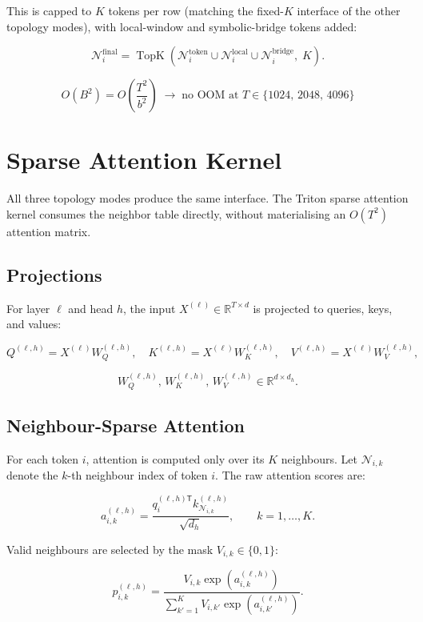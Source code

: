 \documentclass[11pt]{article}
\newcommand{\R}{\mathbb{R}}
\newcommand{\TopK}{\operatorname{TopK}}
\begin{document}
This is capped to $K$ tokens per row (matching the fixed-$K$ interface
of the other topology modes), with local-window and symbolic-bridge
tokens added:

\[
\mathcal{N}_i^{\text{final}}
= \TopK\!\left(
    \mathcal{N}_i^{\text{token}}
    \cup \mathcal{N}_i^{\text{local}}
    \cup \mathcal{N}_i^{\text{bridge}},\;
    K
  \right).
\]

\[
\boxed{
  O(B^2) = O\!\left(\frac{T^2}{b^2}\right)
  \;\longrightarrow\;
  \text{no OOM at }T \in \{1024,\,2048,\,4096\}
}
\]

\section*{Sparse Attention Kernel}

All three topology modes produce the same interface.
The Triton sparse attention kernel consumes the neighbor table directly,
without materialising an $O(T^2)$ attention matrix.

\subsection*{Projections}

For layer $\ell$ and head $h$, the input $X^{(\ell)} \in \R^{T \times d}$
is projected to queries, keys, and values:

\[
Q^{(\ell,h)} = X^{(\ell)} W_Q^{(\ell,h)},
\quad
K^{(\ell,h)} = X^{(\ell)} W_K^{(\ell,h)},
\quad
V^{(\ell,h)} = X^{(\ell)} W_V^{(\ell,h)},
\]

\[
W_Q^{(\ell,h)},\, W_K^{(\ell,h)},\, W_V^{(\ell,h)} \in \R^{d \times d_h}.
\]

\subsection*{Neighbour-Sparse Attention}

For each token $i$, attention is computed only over its $K$ neighbours.
Let $\mathcal{N}_{i,k}$ denote the $k$-th neighbour index of token $i$.
The raw attention scores are:

\[
a_{i,k}^{(\ell,h)}
= \frac{q_i^{(\ell,h)\mathsf{T}} k_{\mathcal{N}_{i,k}}^{(\ell,h)}}{\sqrt{d_h}},
\qquad k = 1,\ldots,K.
\]

Valid neighbours are selected by the mask $V_{i,k} \in \{0,1\}$:

\[
p_{i,k}^{(\ell,h)}
= \frac{V_{i,k}\exp(a_{i,k}^{(\ell,h)})}
       {\sum_{k'=1}^{K} V_{i,k'}\exp(a_{i,k'}^{(\ell,h)})}.
\]
\end{document}
